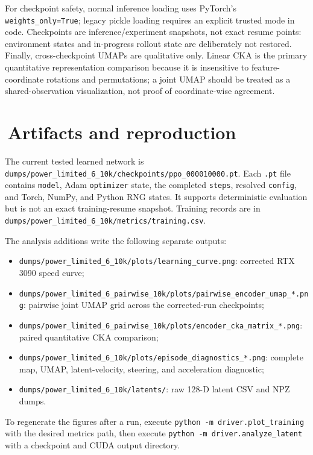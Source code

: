 \documentclass[10pt]{article}
\newcommand{\code}[1]{\texttt{#1}}
\begin{document}
For checkpoint safety, normal inference loading uses PyTorch's
\code{weights\_only=True}; legacy pickle loading requires an explicit trusted
mode in code. Checkpoints are inference/experiment snapshots, not exact resume
points: environment states and in-progress rollout state are deliberately not
restored. Finally, cross-checkpoint UMAPs are qualitative only. Linear CKA is
the primary quantitative representation comparison because it is insensitive to
feature-coordinate rotations and permutations; a joint UMAP should be treated
as a shared-observation visualization, not proof of coordinate-wise agreement.

\section{\,Artifacts and reproduction}
The current tested learned network is
\code{dumps/power\_limited\_6\_10k/checkpoints/ppo\_000010000.pt}. Each \code{.pt} file contains
\code{model}, Adam \code{optimizer} state, the completed \code{steps}, resolved
\code{config}, and Torch, NumPy, and Python RNG states. It supports deterministic
evaluation but is not an exact training-resume snapshot.
Training records are in \code{dumps/power\_limited\_6\_10k/metrics/training.csv}.

The analysis additions write the following separate outputs:
\begin{itemize}[leftmargin=1.4em,itemsep=2pt]
 \item \code{dumps/power\_limited\_6\_10k/plots/learning\_curve.png}: corrected RTX 3090 speed curve;
 \item \code{dumps/power\_limited\_6\_pairwise\_10k/plots/pairwise\_encoder\_umap\_*.png}: pairwise
       joint UMAP grid across the corrected-run checkpoints;
 \item \code{dumps/power\_limited\_6\_pairwise\_10k/plots/encoder\_cka\_matrix\_*.png}: paired
       quantitative CKA comparison;
 \item \code{dumps/power\_limited\_6\_10k/plots/episode\_diagnostics\_*.png}: complete map, UMAP,
       latent-velocity, steering, and acceleration diagnostic;
 \item \code{dumps/power\_limited\_6\_10k/latents/}: raw 128-D latent CSV and NPZ dumps.
\end{itemize}
To regenerate the figures after a run, execute \code{python -m driver.plot\_training}
with the desired metrics path, then execute \code{python -m driver.analyze\_latent}
with a checkpoint and CUDA output directory.
\end{document}

